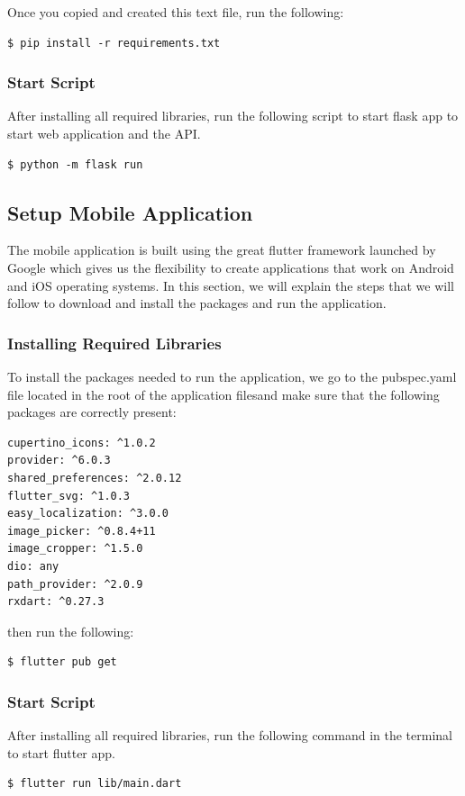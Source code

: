 \noindent
Once you copied and created this text file, run the following:

\begin{verbatim}
$ pip install -r requirements.txt
\end{verbatim}

\subsubsection{Start Script}
After installing all required libraries, run the following script to start flask app to start web application and the API.

\begin{verbatim}
$ python -m flask run
\end{verbatim}

\subsection{Setup Mobile Application}
The mobile application is built using the great flutter framework launched by Google which gives us the flexibility to create applications that work on Android and iOS operating systems.
In this section, we will explain the steps that we will follow to download and install the packages and run the application.
\subsubsection{Installing Required Libraries}
To install the packages needed to run the application, we go to the pubspec.yaml file located in the root of the application filesand make sure that the following packages are correctly present:
\begin{verbatim}
cupertino_icons: ^1.0.2
provider: ^6.0.3
shared_preferences: ^2.0.12
flutter_svg: ^1.0.3
easy_localization: ^3.0.0
image_picker: ^0.8.4+11
image_cropper: ^1.5.0
dio: any
path_provider: ^2.0.9
rxdart: ^0.27.3
\end{verbatim}
then run the following:
\begin{verbatim}
$ flutter pub get
\end{verbatim}

\subsubsection{Start Script}
After installing all required libraries, run the following command in the terminal to start flutter app.

\begin{verbatim}
$ flutter run lib/main.dart
\end{verbatim}

